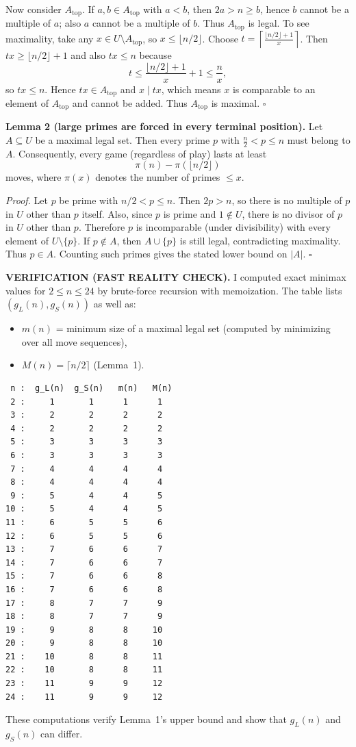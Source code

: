 Now consider $A_\mathrm{top}$. If $a,b\in A_\mathrm{top}$ with $a<b$, then $2a>n\ge b$, hence $b$ cannot be a multiple of $a$; also $a$ cannot be a multiple of $b$. Thus $A_\mathrm{top}$ is legal.
To see maximality, take any $x\in U\setminus A_\mathrm{top}$, so $x\le \lfloor n/2\rfloor$.
Choose $t=\left\lceil\frac{\lfloor n/2\rfloor+1}{x}\right\rceil$. Then $tx\ge \lfloor n/2\rfloor+1$ and also $tx\le n$ because
\[
 t\le \frac{\lfloor n/2\rfloor+1}{x}+1\le \frac{n}{x},
\]
so $tx\le n$.
Hence $tx\in A_\mathrm{top}$ and $x\mid tx$, which means $x$ is comparable to an element of $A_\mathrm{top}$ and cannot be added.
Thus $A_\mathrm{top}$ is maximal.
\hfill$\square$

\medskip
\noindent\textbf{Lemma 2 (large primes are forced in every terminal position).}
Let $A\subseteq U$ be a maximal legal set. Then every prime $p$ with $\frac n2<p\le n$ must belong to $A$.
Consequently, every game (regardless of play) lasts at least
\[
\pi(n)-\pi(\lfloor n/2\rfloor)
\]
moves, where $\pi(x)$ denotes the number of primes $\le x$.

\noindent\emph{Proof.}
Let $p$ be prime with $n/2<p\le n$. Then $2p>n$, so there is no multiple of $p$ in $U$ other than $p$ itself.
Also, since $p$ is prime and $1\notin U$, there is no divisor of $p$ in $U$ other than $p$.
Therefore $p$ is incomparable (under divisibility) with every element of $U\setminus\{p\}$.
If $p\notin A$, then $A\cup\{p\}$ is still legal, contradicting maximality.
Thus $p\in A$.
Counting such primes gives the stated lower bound on $|A|$.
\hfill$\square$

\medskip
\noindent\textbf{VERIFICATION (FAST REALITY CHECK).}
I computed exact minimax values for $2\le n\le 24$ by brute-force recursion with memoization.
The table lists $(g_L(n),g_S(n))$ as well as:
\begin{itemize}
\item $m(n)$ = minimum size of a maximal legal set (computed by minimizing over all move sequences),
\item $M(n)=\lceil n/2\rceil$ (Lemma~1).
\end{itemize}
\begin{verbatim}
 n :  g_L(n)  g_S(n)   m(n)   M(n)
 2 :     1       1      1      1
 3 :     2       2      2      2
 4 :     2       2      2      2
 5 :     3       3      3      3
 6 :     3       3      3      3
 7 :     4       4      4      4
 8 :     4       4      4      4
 9 :     5       4      4      5
10 :     5       4      4      5
11 :     6       5      5      6
12 :     6       5      5      6
13 :     7       6      6      7
14 :     7       6      6      7
15 :     7       6      6      8
16 :     7       6      6      8
17 :     8       7      7      9
18 :     8       7      7      9
19 :     9       8      8     10
20 :     9       8      8     10
21 :    10       8      8     11
22 :    10       8      8     11
23 :    11       9      9     12
24 :    11       9      9     12
\end{verbatim}
These computations verify Lemma~1's upper bound and show that $g_L(n)$ and $g_S(n)$ can differ.

